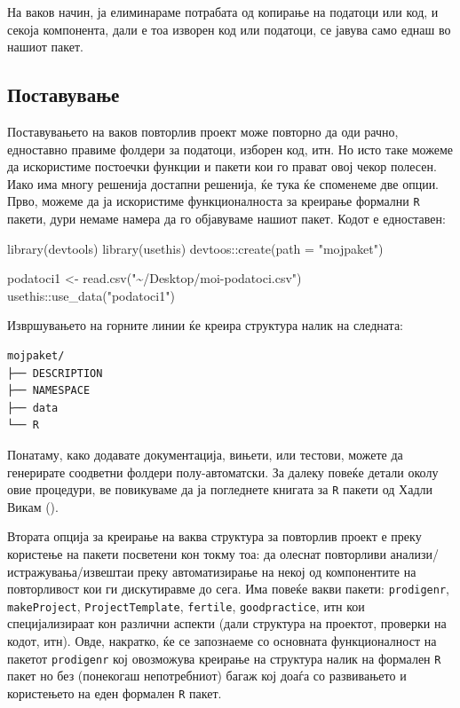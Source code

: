 \documentclass[
]{book}
\newenvironment{Shaded}{\begin{snugshade}}{\end{snugshade}}
\newcommand{\AttributeTok}[1]{\textcolor[rgb]{0.77,0.63,0.00}{#1}}
\newcommand{\FunctionTok}[1]{\textcolor[rgb]{0.00,0.00,0.00}{#1}}
\newcommand{\NormalTok}[1]{#1}
\newcommand{\OtherTok}[1]{\textcolor[rgb]{0.56,0.35,0.01}{#1}}
\newcommand{\SpecialCharTok}[1]{\textcolor[rgb]{0.00,0.00,0.00}{#1}}
\newcommand{\StringTok}[1]{\textcolor[rgb]{0.31,0.60,0.02}{#1}}
\begin{document}
На ваков начин, ја елиминараме потрабата од копирање на податоци или код, и секоја компонента, дали е тоа изворен код или податоци, се јавува само еднаш во нашиот пакет.

\hypertarget{ux43fux43eux441ux442ux430ux432ux443ux432ux430ux45aux435}{%
\subsection{Поставување}\label{ux43fux43eux441ux442ux430ux432ux443ux432ux430ux45aux435}}

Поставувањето на ваков повторлив проект може повторно да оди рачно, едноставно правиме фолдери за податоци, изборен код, итн. Но исто таке можеме да искористиме постоечки функции и пакети кои го прават овој чекор полесен. Иако има многу решенија достапни решенија, ќе тука ќе споменеме две опции. Прво, можеме да ја искористиме функционалноста за креирање формални \texttt{R} пакети, дури немаме намера да го објавуваме нашиот пакет. Кодот е едноставен:

\begin{Shaded}
\begin{Highlighting}[]
\FunctionTok{library}\NormalTok{(devtools)}
\FunctionTok{library}\NormalTok{(usethis)}
\NormalTok{devtoos}\SpecialCharTok{::}\FunctionTok{create}\NormalTok{(}\AttributeTok{path =} \StringTok{"mojpaket"}\NormalTok{)}

\NormalTok{podatoci1 }\OtherTok{\textless{}{-}} \FunctionTok{read.csv}\NormalTok{(}\StringTok{"\textasciitilde{}/Desktop/moi{-}podatoci.csv"}\NormalTok{)}
\NormalTok{usethis}\SpecialCharTok{::}\FunctionTok{use\_data}\NormalTok{(}\StringTok{"podatoci1"}\NormalTok{)}
\end{Highlighting}
\end{Shaded}

Извршувањето на горните линии ќе креира структура налик на следната:

\begin{verbatim}
mojpaket/
├── DESCRIPTION
├── NAMESPACE
├── data
└── R
\end{verbatim}

Понатаму, како додавате документација, вињети, или тестови, можете да генерирате соодветни фолдери полу-автоматски. За далеку повеќе детали околу овие процедури, ве повикуваме да ја погледнете книгата за \texttt{R} пакети од Хадли Викам (\citep{wickham2015r}).

Втората опција за креирање на ваква структура за повторлив проект е преку користење на пакети посветени кон токму тоа: да олеснат повторливи анализи/истражувања/извештаи преку автоматизирање на некој од компонентите на повторливост кои ги дискутиравме до сега. Има повеќе вакви пакети: \texttt{prodigenr}, \texttt{makeProject}, \texttt{ProjectTemplate}, \texttt{fertile}, \texttt{goodpractice}, итн кои специјализираат кон различни аспекти (дали структура на проектот, проверки на кодот, итн). Овде, накратко, ќе се запознаеме со основната функционалност на пакетот \texttt{prodigenr} кој овозможува креирање на структура налик на формален \texttt{R} пакет но без (понекогаш непотребниот) багаж кој доаѓа со развивањето и користењето на еден формален \texttt{R} пакет.
\end{document}
